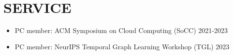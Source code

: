 \documentclass[centered,overlapped]{res}
\begin{document}
\begin{resume}
\begin{enumerate}
\end{enumerate}

\section{SERVICE}
  \begin{itemize}  \itemsep -2pt
  \item PC member: ACM Symposium on Cloud Computing (SoCC) 2021-2023
  \item PC member: NeurIPS Temporal Graph Learning Workshop (TGL) 2023
  \end{itemize}

%


\end{resume}
\end{document}
